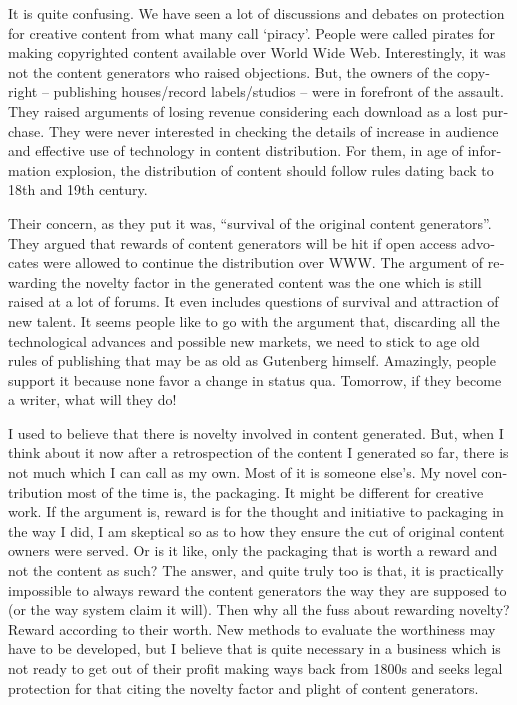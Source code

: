 \begin{english}
It is quite confusing. We have seen a lot of discussions and debates on protection for creative content from what many call `piracy'. People were called pirates for making copyrighted content available over World Wide Web. Interestingly, it was not the content generators who raised objections. But, the owners of the copyright -- publishing houses/record labels/studios -- were in forefront of the assault. They raised arguments of losing revenue considering each download as a lost purchase. They were never interested in checking the details of increase in audience and effective use of technology in content distribution. For them, in age of information explosion, the distribution of content should follow rules dating back to 18th and 19th century. 

Their concern, as they put it was, ``survival of the original content generators''. They argued that rewards of content generators will be hit if open access advocates were allowed to continue the distribution over WWW. The argument of rewarding the novelty factor in the generated content was the one which is still raised at a lot of forums. It even includes questions of survival and attraction of new talent. It seems people like to go with the argument that, discarding all the technological advances and possible new markets, we need to stick to age old rules of publishing that may be as old as Gutenberg himself. Amazingly, people support it because none favor a change in status qua. Tomorrow, if they become a writer, what will they do!

I used to believe that there is novelty involved in content generated. But, when I think about it now after a retrospection of the content I generated so far, there is not much which I can call as my own. Most of it is someone else's. My novel contribution most of the time is, the packaging. It might be different for creative work. If the argument is, reward is for the thought and initiative to packaging in the way I did, I am skeptical so as to how they ensure the cut of original content owners were served. Or is it like, only the packaging that is worth a reward and not the content as such? The answer, and quite truly too is that, it is practically impossible to always reward the content generators the way they are supposed to (or the way system claim it will). Then why all the fuss about rewarding novelty? Reward according to their worth. New methods to evaluate the worthiness may have to be developed, but I believe that is quite necessary in a business which is not ready to get out of their profit making ways back from 1800s and seeks legal protection for that citing the novelty factor and plight of content generators.   


\end{english}
